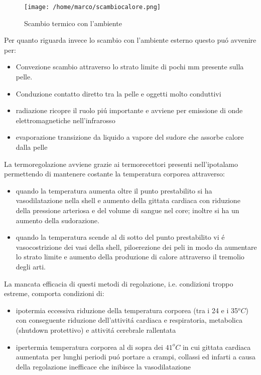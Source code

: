 \documentclass[10pt]{article}
\begin{document}
\begin{figure}[h!]
\centering
\texttt{[image: /home/marco/scambiocalore.png]}
\caption{Scambio termico con l'ambiente}
\label{fig:scambio_termico}
\end{figure}

Per quanto riguarda invece lo scambio con l'ambiente esterno questo puó avvenire per:
\begin{itemize}
\item Convezione \textrightarrow scambio attraverso lo strato limite di pochi mm presente sulla pelle.
\item Conduzione \textrightarrow contatto diretto tra la pelle e oggetti molto conduttivi
\item radiazione \textrightarrow ricopre il ruolo piú importante e avviene per emissione di onde elettromagnetiche nell'infrarosso
\item evaporazione \textrightarrow transizione da liquido a vapore del sudore che assorbe calore dalla pelle
\end{itemize}

La termoregolazione avviene grazie ai termorecettori presenti nell'ipotalamo permettendo di mantenere costante la temperatura corporea attraverso:
\begin{itemize}
\item quando la temperatura aumenta oltre il punto prestabilito si ha vasodilatazione nella shell e aumento della gittata cardiaca con riduzione della pressione arteriosa e del volume di sangue nel core; inoltre si ha un aumento della sudorazione.
\item quando la temperatura scende al di sotto del punto prestabilito vi é vasocostrizione dei vasi della shell, piloerezione dei peli in modo da aumentare lo strato limite e aumento della produzione di calore attraverso il tremolio degli arti.
\end{itemize}

La mancata efficacia di questi metodi di regolazione, i.e. condizioni troppo estreme, comporta condizioni di:
\begin{itemize}
\item ipotermia \textrightarrow eccessiva riduzione della temperatura corporea (tra i 24 e i 35$^oC$) con conseguente riduzione dell'attivitá cardiaca e respiratoria, metabolica (shutdown protettivo) e attivitá cerebrale rallentata
\item ipertermia \textrightarrow temperatura corporea al di sopra dei $41 ^oC$ in cui gittata cardiaca aumentata per lunghi periodi puó portare a crampi, collassi  ed infarti a causa della regolazione inefficace che inibisce la vasodilatazione
\end{itemize}
\end{document}
